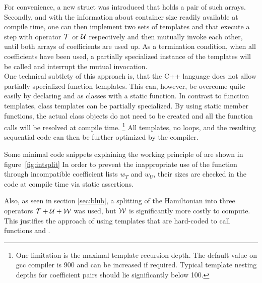 For convenience, a new struct  was introduced that holds a pair of such arrays.
Secondly, and with the information about container size readily available at compile time, one can then implement two sets of templates  and  that execute a step with operator $\mathcal{T}$ or $\mathcal{U}$ respectively and then mutually invoke each other, until both arrays of coefficients are used up.
As a termination condition, when all coefficients have been used, a partially specialized instance of the templates will be called and interrupt the mutual invocation. \\
%
One technical subtlety of this approach is, that the C++ language does not allow partially specialized function templates. This can, however, be overcome quite easily by declaring  and  as classes with a static function.
In contrast to function templates, class templates can be partially specialized.
By using static member functions, the actual class objects do not need to be created and all the function calls will be resolved at compile time.
\footnote{One limitation is the maximal template recursion depth. The default value on gcc compiler is 900 and can be increased if required. Typical template nesting depths for coefficient pairs should lie significantly below 100.}
All templates, no loops, and the resulting sequential code can then be further optimized by the compiler.
\par\medskip
%
Some minimal code snippets explaining the working principle of  are shown in figure~\ref{fig:intsplit}
%
In order to prevent the inappropriate use of the  function through incompatible coefficient lists $w_T$ and $w_U$, their sizes are checked in the code at compile time via static assertions.
\par\medskip
%
Also, as seen in section \ref{sec:blub}, a splitting of the Hamiltonian into three operators $\mathcal{T} + \mathcal{U} + \mathcal{W}$ was used, but $\mathcal{W}$ is significantly more costly to compute.
This justifies the approach of using templates that are hard-coded to call functions  and .

